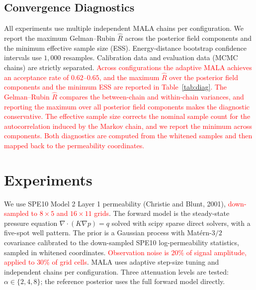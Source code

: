 \documentclass[12pt]{article}
\newcommand{\add}[1]{\textcolor{red}{#1}}
\begin{document}
\subsection{Convergence Diagnostics}

All experiments use multiple independent MALA chains per configuration. We report the maximum Gelman--Rubin $\hat R$ across the posterior field components and the minimum effective sample size (ESS). Energy-distance bootstrap confidence intervals use $1{,}000$ resamples. Calibration data and evaluation data (MCMC chains) are strictly separated. \add{Across configurations the adaptive MALA achieves an acceptance rate of $0.62$--$0.65$, and the maximum $\hat R$ over the posterior field components and the minimum ESS are reported in Table~\ref{tab:diag}. The Gelman--Rubin $\hat R$ compares the between-chain and within-chain variances, and reporting the maximum over all posterior field components makes the diagnostic conservative. The effective sample size corrects the nominal sample count for the autocorrelation induced by the Markov chain, and we report the minimum across components. Both diagnostics are computed from the whitened samples and then mapped back to the permeability coordinates.}

\section{Experiments}

We use SPE10 Model 2 Layer 1 permeability (Christie and Blunt, 2001), \add{down-sampled to $8\times5$ and $16\times11$ grids}. The forward model is the steady-state pressure equation $\nabla\cdot(K\nabla p)=q$ solved with scipy sparse direct solvers, with a five-spot well pattern. The prior is a Gaussian process with Mat\'ern-$3/2$ covariance calibrated to the down-sampled SPE10 log-permeability statistics, sampled in whitened coordinates. \add{Observation noise is $20\%$ of signal amplitude, applied to $30\%$ of grid cells}. MALA uses adaptive step-size tuning and independent chains per configuration. Three attenuation levels are tested: $\alpha\in\{2,4,8\}$; the reference posterior uses the full forward model directly.
\end{document}
